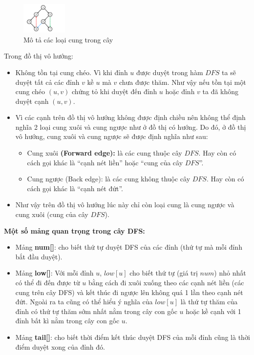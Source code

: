 \documentclass{article}
\begin{document}
\begin{figure}[h]
    \centering
    \includegraphics[width=0.2\textwidth]{img/b3/Depth-First-Search-Tree_img2.png}   
    \caption{Mô tả các loại cung trong cây} 
\end{figure}


Trong đồ thị vô hướng:
\begin{itemize}
    \item Không tồn tại cung chéo. Vì khi đỉnh $u$ được duyệt trong hàm $DFS$ ta sẽ duyệt tất cả các đỉnh $v$ kề $u$ mà $v$ chưa được thăm. Như vậy nếu tồn tại một cung chéo $(u, v)$ chứng tỏ khi duyệt đến đỉnh $u$ hoặc đỉnh $v$ ta đã không duyệt cạnh $(u, v)$.
    \item Vì các cạnh trên đồ thị vô hướng không được định chiều nên không thể định nghĩa 2 loại cung xuôi và cung ngược như ở đồ thị có hướng. Do đó, ở đồ thị vô hướng, cung xuôi và cung ngược sẽ được định nghĩa như sau:
    \begin{itemize}
        \item Cung xuôi \textbf{(Forward edge):} là các cung thuộc cây $DFS$. Hay còn có cách gọi khác là ``cạnh nét liền'' hoặc ``cung của cây $DFS$''.
        \item Cung ngược (Back edge): là các cung không thuộc cây $DFS$. Hay còn có cách gọi khác là ``cạnh nét đứt''.
    \end{itemize}
    \item Như vậy trên đồ thị vô hướng lúc này chỉ còn  loại cung là cung ngược và cung xuôi (cung của cây $DFS$).
\end{itemize}

\textbf{Một số mảng quan trọng trong cây DFS:}

\begin{itemize}
    \item Mảng \textbf{num[]}: cho biết thứ tự duyệt DFS của các đỉnh (thứ tự mà mỗi đỉnh bắt đầu duyệt).
    \item Mảng \textbf{low[]}: Với mỗi đỉnh $u$, $low[u]$ cho biết thứ tự (giá trị $num$) nhỏ nhất có thể đi đến được từ $u$ bằng cách đi xuôi xuống theo các cạnh nét liền (các cung trên cây DFS) và kết thúc đi ngược lên không quá 1 lần theo cạnh nét đứt. Ngoài ra ta cũng có thể hiểu ý nghĩa của $low[u]$ là thứ tự thăm của đỉnh có thứ tự thăm sớm nhất nằm trong cây con gốc $u$ hoặc kề cạnh với 1 đỉnh bất kì nằm trong cây con gốc $u$.
    \item Mảng \textbf{tail[]}: cho biết thời điểm kết thúc duyệt DFS của mỗi đỉnh cũng là thời điểm duyệt xong của đỉnh đó.
\end{itemize}
\end{document}
